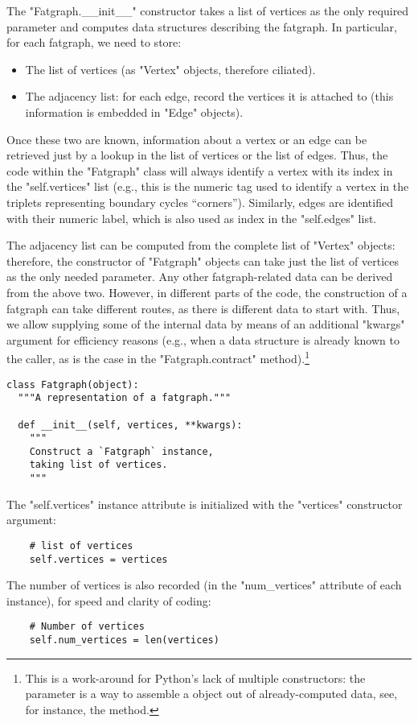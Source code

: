 The "Fatgraph.__init__" constructor takes a list of vertices as the
only required parameter and computes data structures describing
the fatgraph.  In particular, for each fatgraph, we need to store:
\begin{itemize}
\item The list of vertices (as "Vertex" objects, therefore ciliated).
\item The adjacency list: for each edge, record the vertices it is
  attached to (this information is embedded in "Edge" objects).
\end{itemize}
Once these two are known, information about a vertex or an edge can be
retrieved just by a lookup in the list of vertices or the list of
edges.  Thus, the code within the "Fatgraph" class will always
identify a vertex with its index in the "self.vertices" list (e.g.,
this is the numeric tag used to identify a vertex in the triplets
representing boundary cycles ``corners''). Similarly, edges are
identified with their numeric label, which is also used as index in
the "self.edges" list.

The adjacency list can be computed from the complete list of "Vertex" objects:
therefore, the constructor of "Fatgraph" objects can take just the
list of vertices as the only needed parameter.  Any other
fatgraph-related data can be derived from the above two.  However, in
different parts of the code, the construction of a fatgraph can take
different routes, as there is different data to start with.
Thus, we allow supplying some of the internal data by means of an
additional "kwargs" argument for efficiency reasons (e.g., when a data
structure is already known to the caller, as is the case in the
"Fatgraph.contract" method).\footnote{This is a
  work-around for Python's lack of multiple constructors: the
   parameter is a way to assemble a  object out of
  already-computed data, see, for instance, the 
  method.}
\begin{lstlisting}
class Fatgraph(object):
  """A representation of a fatgraph."""

  def __init__(self, vertices, **kwargs):
    """
    Construct a `Fatgraph` instance, 
    taking list of vertices.
    """
\end{lstlisting}
The "self.vertices" instance attribute is initialized with the
"vertices" constructor argument:
\begin{lstlisting}
    # list of vertices
    self.vertices = vertices

\end{lstlisting}
The number of vertices is also recorded (in the "num_vertices"
attribute of each instance), for speed and clarity of coding:
\begin{lstlisting}
    # Number of vertices  
    self.num_vertices = len(vertices)

\end{lstlisting}

